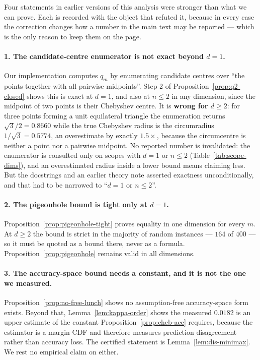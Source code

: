 Four statements in earlier versions of this analysis were stronger than what we can
prove. Each is recorded with the object that refuted it, because in every case the
correction changes how a number in the main text may be reported --- which is the
only reason to keep them on the page.

\paragraph{1. The candidate-centre enumerator is not exact beyond $d=1$.}
Our implementation computes $q_m$ by enumerating candidate centres over ``the points
together with all pairwise midpoints''. Step 2 of Proposition~\ref{prop:q2-closed}
shows this is exact at $d=1$, and also at $n\le2$ in any dimension, since the
midpoint of two points is their Chebyshev centre. It is \textbf{wrong for $d\ge2$}:
for three points forming a unit equilateral triangle the enumeration returns
$\sqrt3/2=0.8660$ while the true Chebyshev radius is the circumradius
$1/\sqrt3=0.5774$, an overestimate by exactly $1.5\times$, because the circumcentre
is neither a point nor a pairwise midpoint. No reported number is invalidated: the
enumerator is consulted only on scopes with $d=1$ or $n\le2$
(Table~\ref{tab:scope-dims}), and an overestimated radius inside a lower bound means
claiming less. But the docstrings and an earlier theory note asserted exactness
unconditionally, and that had to be narrowed to ``$d=1$ or $n\le2$''.

\paragraph{2. The pigeonhole bound is tight only at $d=1$.}
Proposition~\ref{prop:pigeonhole-tight} proves equality in one dimension for every
$m$. At $d\ge2$ the bound is strict in the majority of random instances --- $164$ of
$400$ --- so it must be quoted as a bound there, never as a formula.
Proposition~\ref{prop:pigeonhole} remains valid in all dimensions.

\paragraph{3. The accuracy-space bound needs a constant, and it is not the one we
measured.} Proposition~\ref{prop:no-free-lunch} shows no assumption-free
accuracy-space form exists. Beyond that, Lemma~\ref{lem:kappa-order} shows the
measured $0.0182$ is an upper estimate of the constant
Proposition~\ref{prop:cheb-acc} requires, because the estimator is a margin CDF and
therefore measures prediction disagreement rather than accuracy loss. The certified
statement is Lemma~\ref{lem:dis-minimax}. We rest no empirical claim on either.

